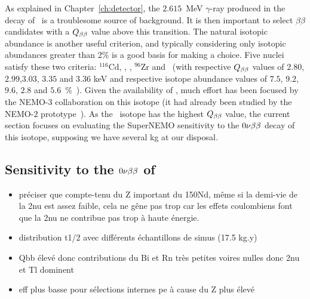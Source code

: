 As explained in Chapter~\ref{ch:detector}, the $2.615$~MeV $\gamma$-ray produced in the decay of \Tl\ is a troublesome source of background.
It is then important to select $\beta\beta$ candidates with a $Q_{\beta\beta}$ value above this transition.
The natural isotopic abundance is another useful criterion, and typically considering only isotopic abundances greater than 2\% is a good basis for making a choice.
Five nuclei satisfy these two criteria: $^{116}$Cd, \Se, \Mo, $^{96}$Zr and \Nd\ (with respective $Q_{\beta\beta}$ values of $2.80$, $2.99$,$3.03$, $3.35$ and $3.36$ keV and respective isotope abundance values of $7.5$, $9.2$, $9.6$, $2.8$ and $5.6$~\%~\cite{art:atomic_mass}).
Given the availability of \Mo, much effort has been focused by the NEMO-$3$ collaboration on this isotope (it had already been studied by the NEMO-$2$ prototype~\cite{art:NEMO2}).
As the \Nd\ isotope has the highest $Q_{\beta\beta}$ value, the current section focuses on evaluating the SuperNEMO sensitivity to the $0\nu\beta\beta$ decay of this isotope, supposing we have several kg at our disposal.

\subsection{Sensitivity to the $0\nu\beta\beta$ of \Nd}











\begin{itemize}
\item préciser que compte-tenu du Z important du 150Nd, même si la demi-vie de la 2nu est assez faible, cela ne gêne pas trop car les effets coulombiens font que la 2nu ne contribue pas trop à haute énergie.
\item distribution t1/2 avec différents échantillons de simus (17.5 kg.y)
\item Qbb élevé donc contributions du Bi et Rn très petites voires nulles donc 2nu et Tl dominent
\item eff plus basse pour sélections internes pe à cause du Z plus élevé
\end{itemize}

